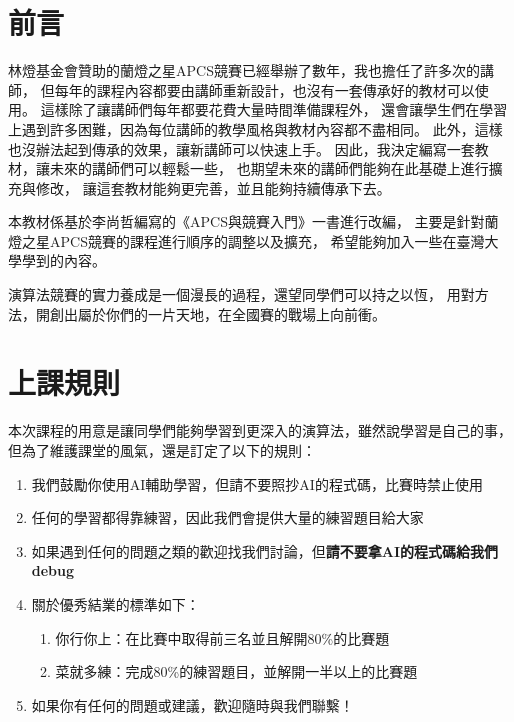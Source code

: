 \chapter*{前言}


林燈基金會贊助的蘭燈之星APCS競賽已經舉辦了數年，我也擔任了許多次的講師，
但每年的課程內容都要由講師重新設計，也沒有一套傳承好的教材可以使用。
這樣除了讓講師們每年都要花費大量時間準備課程外，
還會讓學生們在學習上遇到許多困難，因為每位講師的教學風格與教材內容都不盡相同。
此外，這樣也沒辦法起到傳承的效果，讓新講師可以快速上手。
因此，我決定編寫一套教材，讓未來的講師們可以輕鬆一些，
也期望未來的講師們能夠在此基礎上進行擴充與修改，
讓這套教材能夠更完善，並且能夠持續傳承下去。

本教材係基於李尚哲編寫的《APCS與競賽入門》一書進行改編，
主要是針對蘭燈之星APCS競賽的課程進行順序的調整以及擴充，
希望能夠加入一些在臺灣大學學到的內容。


演算法競賽的實力養成是一個漫長的過程，還望同學們可以持之以恆，
用對方法，開創出屬於你們的一片天地，在全國賽的戰場上向前衝。

\chapter*{上課規則}

本次課程的用意是讓同學們能夠學習到更深入的演算法，雖然說學習是自己的事，但為了維護課堂的風氣，還是訂定了以下的規則：

\begin{enumerate}
    \item 我們鼓勵你使用AI輔助學習，但請不要照抄AI的程式碼，比賽時禁止使用
    \item 任何的學習都得靠練習，因此我們會提供大量的練習題目給大家
    \item 如果遇到任何的問題之類的歡迎找我們討論，但\textbf{請不要拿AI的程式碼給我們debug}
    \item 關於優秀結業的標準如下：
    \begin{enumerate}
        \item 你行你上：在比賽中取得前三名並且解開80\%的比賽題
        \item 菜就多練：完成80\%的練習題目，並解開一半以上的比賽題
    \end{enumerate}
    \item 如果你有任何的問題或建議，歡迎隨時與我們聯繫！

\end{enumerate}